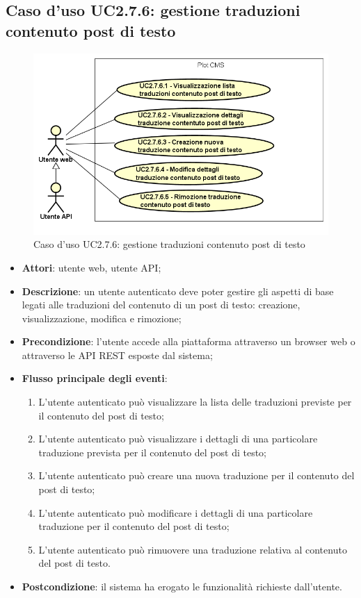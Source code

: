 \subsection{Caso d'uso UC2.7.6: gestione traduzioni contenuto post di testo}

        \begin{figure}
            \centering
            \includegraphics[scale=0.95, width=\textwidth]{immagini/usecase/UC2-7-6.png}
            \caption{Caso d'uso UC2.7.6: gestione traduzioni contenuto post di testo}\label{fig:UC2.7.6} 
        \end{figure}
\begin{itemize}
\item \textbf{Attori}: utente web, utente API;
\item \textbf{Descrizione}: un utente autenticato deve poter gestire gli aspetti di base legati alle traduzioni del contenuto di un post di testo: creazione, visualizzazione, modifica e rimozione; 
      \item \textbf{Precondizione}: l'utente accede alla piattaforma attraverso un browser web o attraverso le API REST esposte dal sistema;

        \item \textbf{Flusso principale degli eventi}:
          \begin{enumerate}
          \item L'utente autenticato può visualizzare la lista delle traduzioni previste per il contenuto del post di testo;
          \item L'utente autenticato può visualizzare i dettagli di una particolare traduzione prevista per il contenuto del post di testo;
          \item L'utente autenticato può creare una nuova traduzione per il contenuto del post di testo;
          \item L'utente autenticato può modificare i dettagli di una particolare traduzione per il contenuto del post di testo;
          \item L'utente autenticato può rimuovere una traduzione relativa al contenuto del post di testo.

      \end{enumerate}
    \item \textbf{Postcondizione}: il sistema ha erogato le funzionalità richieste dall'utente.
  \end{itemize}
\hypertarget{UC2.8}{}
